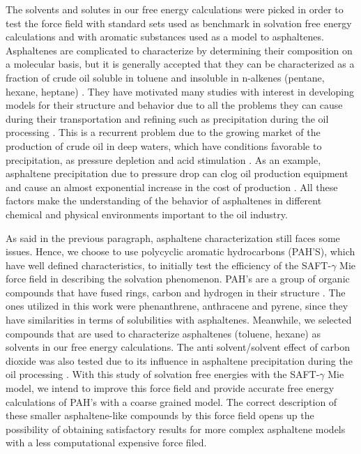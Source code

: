 The solvents and solutes in our free energy calculations were picked in order to test the force field with standard sets used as benchmark in solvation free energy calculations and with aromatic substances used as a model to asphaltenes. Asphaltenes are complicated to characterize by determining their composition on a molecular basis, but it is generally accepted that they can be characterized as a fraction of crude oil soluble in toluene and insoluble in n-alkenes (pentane, hexane, heptane) \cite{SJOBLOM2003399}. They have motivated many studies with interest in developing models for their structure and behavior due to all the problems they can cause during their transportation and refining such as precipitation  during the oil processing \cite{SJOBLOM20151}. This is a recurrent problem due to the growing market of the production of crude oil in deep waters, which have conditions favorable to precipitation, as pressure depletion and  acid stimulation \cite{AIC:AIC10243}. As an example, asphaltene precipitation due to pressure drop can clog oil production equipment and cause an almost exponential increase in the cost of production \cite{AIC:AIC10243,doi:10.1021/ef010047l}. All these factors make the understanding of the behavior of asphaltenes in different chemical and physical environments important to the oil industry. 

As said in the previous paragraph, asphaltene characterization still faces some issues. Hence, we choose to use polycyclic aromatic hydrocarbons (PAH'S), which have well defined characteristics, to initially test the efficiency of the SAFT-$\gamma$ Mie force field in describing the solvation phenomenon. PAH's are a group of organic compounds that have fused rings, carbon and hydrogen in their structure \cite{RAVINDRA20082895}. The ones utilized in this work were phenanthrene, anthracene and pyrene, since they have  similarities in terms of solubilities with asphaltenes. Meanwhile,  we selected compounds that are used to characterize asphaltenes (toluene, hexane) as solvents in our free energy calculations. The anti solvent/solvent effect of carbon dioxide was also tested due to its influence in asphaltene precipitation during the oil processing \cite{SOROUSH2014405}. With this study of solvation free energies with the SAFT-$\gamma$ Mie model, we intend to improve this force field and provide accurate free energy calculations of PAH's with a coarse grained model. The correct description of these smaller asphaltene-like compounds by this force field opens up the possibility of obtaining satisfactory results for more complex asphaltene models with a less computational expensive force filed.

